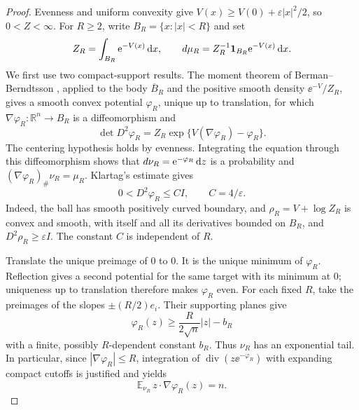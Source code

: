 \begin{proof}
Evenness and uniform convexity give $V(x)\ge V(0)+\varepsilon|x|^2/2$, so $0<Z<\infty$. For $R\ge2$, write $B_R=\{x:|x|<R\}$ and set
\[
 Z_R=\int_{B_R}\mathrm{e}^{-V(x)}\,\mathrm{d} x,
 \qquad d\mu_R=Z_R^{-1}\mathbf1_{B_R}\mathrm{e}^{-V(x)}\,\mathrm{d} x.
\]
We first use two compact-support results.  The moment theorem of Berman--Berndtsson \cite[Theorem~1.1]{BermanBerndtsson2013}, applied to the body $\overline B_R$ and the positive smooth density $\ee^{-V}/Z_R$, gives a smooth convex potential $\varphi_R$, unique up to translation, for which $\nabla\varphi_R:\mathbb{R}^n\to B_R$ is a diffeomorphism and
\begin{equation}\label{eq:moment-truncated}
 \det D^2\varphi_R
   =Z_R\exp\{V(\nabla\varphi_R)-\varphi_R\}.
\end{equation}
The centering hypothesis holds by evenness.  Integrating the equation through this diffeomorphism shows that $d\nu_R=\mathrm{e}^{-\varphi_R}\,\mathrm{d} z$ is a probability and $(\nabla\varphi_R)_\#\nu_R=\mu_R$. Klartag's estimate \cite[Proposition~2 and Remark~1]{Klartag2014Moment} gives
\[
 0<D^2\varphi_R\le CI,\qquad C=4/\varepsilon.
\]
Indeed, the ball has smooth positively curved boundary, and $\rho_R=V+\log Z_R$ is convex and smooth, with itself and all its derivatives bounded on $B_R$, and $D^2\rho_R\ge\varepsilon I$. The constant $C$ is independent of $R$.

Translate the unique preimage of $0$ to $0$.  It is the unique minimum of $\varphi_R$.  Reflection gives a second potential for the same target with its minimum at $0$; uniqueness up to translation therefore makes $\varphi_R$ even.  For each fixed $R$, take the preimages of the slopes $\pm(R/2)e_i$.  Their supporting planes give
\[
 \varphi_R(z)\ge\frac{R}{2\sqrt n}|z|-b_R
\]
with a finite, possibly $R$-dependent constant $b_R$. Thus $\nu_R$ has an exponential tail.  In particular, since $|\nabla\varphi_R|\le R$, integration of $\operatorname{div}(z \ee^{-\varphi_R})$ with expanding compact cutoffs is justified and yields
\begin{equation}\label{eq:moment-source-identity}
 \mathbb{E}_{\nu_R}\,z\cdot\nabla\varphi_R(z)=n.
\end{equation}


\end{proof}
